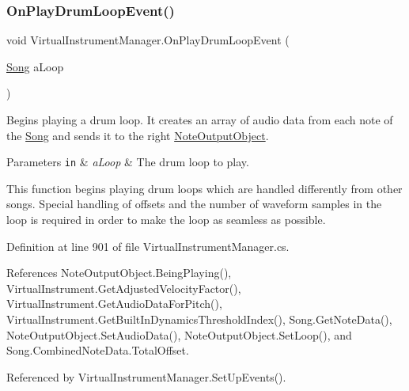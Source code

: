 \subsubsection{\texorpdfstring{On\+Play\+Drum\+Loop\+Event()}{OnPlayDrumLoopEvent()}}
{\footnotesize\ttfamily void Virtual\+Instrument\+Manager.\+On\+Play\+Drum\+Loop\+Event (\begin{DoxyParamCaption}\item[{\hyperlink{class_song}{Song}}]{a\+Loop }\end{DoxyParamCaption})}



Begins playing a drum loop. It creates an array of audio data from each note of the \hyperlink{class_song}{Song} and sends it to the right \hyperlink{class_note_output_object}{Note\+Output\+Object}. 


\begin{DoxyParams}[1]{Parameters}
\mbox{\tt in}  & {\em a\+Loop} & The drum loop to play.\\
\hline
\end{DoxyParams}
This function begins playing drum loops which are handled differently from other songs. Special handling of offsets and the number of waveform samples in the loop is required in order to make the loop as seamless as possible. 

Definition at line 901 of file Virtual\+Instrument\+Manager.\+cs.



References Note\+Output\+Object.\+Being\+Playing(), Virtual\+Instrument.\+Get\+Adjusted\+Velocity\+Factor(), Virtual\+Instrument.\+Get\+Audio\+Data\+For\+Pitch(), Virtual\+Instrument.\+Get\+Built\+In\+Dynamics\+Threshold\+Index(), Song.\+Get\+Note\+Data(), Note\+Output\+Object.\+Set\+Audio\+Data(), Note\+Output\+Object.\+Set\+Loop(), and Song.\+Combined\+Note\+Data.\+Total\+Offset.



Referenced by Virtual\+Instrument\+Manager.\+Set\+Up\+Events().


